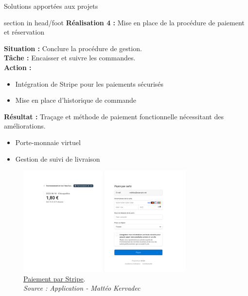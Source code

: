 \documentclass{beamer}
\begin{document}
\begin{frame}{Solutions apportées aux projets}
	\begin{beamercolorbox}[wd=\paperwidth,ht=1.5em,dp=0.5em,leftskip=0.5cm]{section in head/foot}
  		\large \textbf{Réalisation 4 :} \normalsize Mise en place de la procédure de paiement et réservation
	\end{beamercolorbox}
	\vspace{0.5em}
	\begin{center}
		 {	
	  		\begin{minipage}{0.9\textwidth}
  				\textbf{Situation :} Conclure la procédure de gestion. \pause \\
  				\textbf{Tâche :} Encaisser et suivre les commandes. \pause \\
  				\textbf{Action :}
  				\begin{itemize}
  					\item Intégration de Stripe pour les paiements sécurisés
  					\item Mise en place d'historique de commande
  				\end{itemize}
  				\pause
  				
				\textbf{Résultat :} Traçage et méthode de paiement fonctionnelle nécessitant des améliorations.
				\begin{itemize}
					\item Porte-monnaie virtuel
					\item Gestion de suivi de livraison
				\end{itemize}
  			\end{minipage}
  		}
  		
  		\only<5> {
			\begin{figure}[t]
  				\includegraphics[height=5.5cm]{../img/localhost/stripe.png}
				\caption{	
					\centering			
  					\href{https://github.com/Matteo-K/Soutenance_E-delic/blob/main/img/maquette/crud_produit.png}{\underline{Paiement par Stripe}}.\\
  					\textit{Source : Application - Mattéo Kervadec}
				}
  				\label{fig:stripe}
  			\end{figure}
		}
		

\end{center}
\end{frame}
\end{document}
